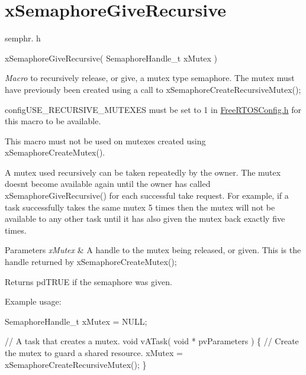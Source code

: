\hypertarget{group__xSemaphoreGiveRecursive}{}\section{x\+Semaphore\+Give\+Recursive}
\label{group__xSemaphoreGiveRecursive}
semphr. h 
\begin{DoxyPre}xSemaphoreGiveRecursive( SemaphoreHandle\_t xMutex )\end{DoxyPre}


{\itshape Macro} to recursively release, or \textquotesingle{}give\textquotesingle{}, a mutex type semaphore. The mutex must have previously been created using a call to x\+Semaphore\+Create\+Recursive\+Mutex();

config\+U\+S\+E\+\_\+\+R\+E\+C\+U\+R\+S\+I\+V\+E\+\_\+\+M\+U\+T\+E\+X\+ES must be set to 1 in \mbox{\hyperlink{FreeRTOSConfig_8h_source}{Free\+R\+T\+O\+S\+Config.\+h}} for this macro to be available.

This macro must not be used on mutexes created using x\+Semaphore\+Create\+Mutex().

A mutex used recursively can be \textquotesingle{}taken\textquotesingle{} repeatedly by the owner. The mutex doesn\textquotesingle{}t become available again until the owner has called x\+Semaphore\+Give\+Recursive() for each successful \textquotesingle{}take\textquotesingle{} request. For example, if a task successfully \textquotesingle{}takes\textquotesingle{} the same mutex 5 times then the mutex will not be available to any other task until it has also \textquotesingle{}given\textquotesingle{} the mutex back exactly five times.


\begin{DoxyParams}{Parameters}
{\em x\+Mutex} & A handle to the mutex being released, or \textquotesingle{}given\textquotesingle{}. This is the handle returned by x\+Semaphore\+Create\+Mutex();\\
\hline
\end{DoxyParams}
\begin{DoxyReturn}{Returns}
pd\+T\+R\+UE if the semaphore was given.
\end{DoxyReturn}
Example usage\+: 
\begin{DoxyPre}
SemaphoreHandle\_t xMutex = NULL;\end{DoxyPre}



\begin{DoxyPre}// A task that creates a mutex.
void vATask( void * pvParameters )
\{
   // Create the mutex to guard a shared resource.
   xMutex = xSemaphoreCreateRecursiveMutex();
\}\end{DoxyPre}



